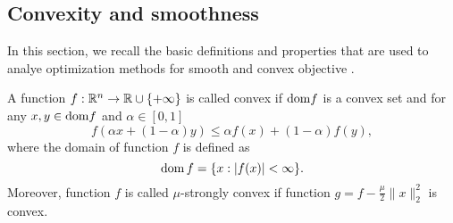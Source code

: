 \subsection{Convexity and smoothness}\label{sec:basics_conv_and_smoothness}
In this section, we recall the basic definitions and properties that are used to analye optimization methods for smooth and convex objective \cite{hiriart2012fundamentals}. 
\begin{definition}
A function $f:\mathbb{R}^n\rightarrow \mathbb{R}\cup\{+\infty\}$ is called convex if $\mathrm{dom} f$ is a convex set and for any $x, y\in \mathrm{dom} f$ and $\alpha \in[0,1]$
\begin{equation}\label{eq:conv_def}
f(\alpha x + (1-\alpha)y)\leq \alpha f(x) + (1-\alpha)f(y),
\end{equation}
where the domain of function $f$ is defined as
$$
\mathrm{dom}\,f = \{x:|f(x)|<\infty\}.
$$
Moreover, function $f$ is called $\mu$-strongly convex if function $g = f - \frac{\mu}{2}\|x\|_2^2$ is convex.
\end{definition}



